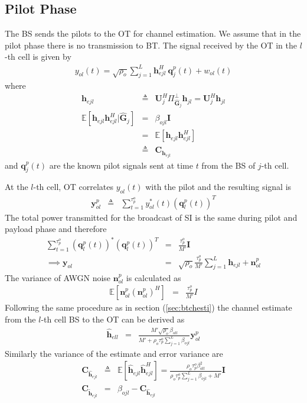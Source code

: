\documentclass[10pt, a4paper, twoside,fleqn]{article}
\begin{document}
\subsection{Pilot Phase}
	The BS sends the pilots to the OT for channel estimation. We assume that in the pilot phase there is no transmission to BT.
The signal received by the OT in the $l$-th cell is given by
\begin{eqnarray}
	y_{ol}(t)=\sqrt{\rho_o} \sum_{j=1}^{L} \pmb{h}^H_{ejl} \ \pmb{q}^p_{j}(t) + w_{ol}(t) 
\end{eqnarray}
where
\begin{eqnarray}
	\pmb{h}_{ejl} &\triangleq& \pmb{U}_j^H\Pi^{\perp}_{{\hat{\pmb{G}}_j}}\pmb{h}_{jl} = \pmb{U}_j^H\pmb{h}_{jl} \\
    \mathbb{E}[\pmb{h}_{ejl}\pmb{h}^H_{ejl}|\pmb{\hat G}_j] &=& \beta_{ojl}\pmb{I} \nonumber \\
			                     &=& \mathbb{E}[\pmb{h}_{ejl}\pmb{h}^H_{ejl}] \nonumber \\
                                           &\triangleq& \pmb{C}_{\pmb{h}_{ejl}} \nonumber
\end{eqnarray}
and $\pmb{q}_j^p(t)$ are the known pilot signals sent at time $t$ from the BS of $j$-th cell.

At the $l$-th cell, OT correlates $y_{ol}(t)$ with the pilot and the resulting signal is
\begin{eqnarray}
	\pmb{y}_{ol}^{p} &\triangleq& \sum_{t=1}^{\tau_p^o} y_{ol}^*(t)(\pmb{q}^{p}_{l}(t))^T \nonumber
\end{eqnarray}
The total power transmitted for the broadcast of SI is the same during pilot and payload phase and therefore
\begin{eqnarray}
    \sum\limits_{t=1}^{\tau_p^o}(\pmb{q}^p_{l}(t))^*(\pmb{q}^p_{l}(t))^T&=&\frac{\tau_p^o}{M'}\pmb{I} \\
\implies \pmb{y}_{ol} &=& \sqrt{\rho_o}\frac{\tau_p^o}{M'}\sum_{j=1}^{L}\pmb{h}_{ejl}+\pmb{n}^p_{ol}
\end{eqnarray}
The variance of AWGN noise $\pmb{n}_{ol}^p$ is calculated as
\begin{eqnarray}
	\mathbb{E}[\pmb{n}^p_{ol}(\pmb{n}^p_{ol})^H] &=& \frac{\tau_p^o}{M'}I \nonumber
\end{eqnarray}
Following the same procedure as in section (\ref{sec:btchesti}) the channel estimate from the $l$-th cell BS to the OT can be derived as 
\begin{eqnarray}\label{eqn:otchesti}
	\pmb{\hat h}_{ell} &=& \frac{M'\sqrt{\rho_o}\beta_{oll}}{M'+\rho_o\tau_p^o\sum\limits_{j=1}^{L}\beta_{ojl}}\pmb{y}^p_{ol}
\end{eqnarray}
Similarly the variance of the estimate and error variance are
\begin{eqnarray}
	\pmb{C}_{\pmb{\hat h}_{ejl}} &\triangleq& \mathbb{E}[\pmb{\hat h}_{ejl}\pmb{\hat h}^H_{ejl}] = \frac{\rho_o\tau_p^o\beta^2_{oll}}{\rho_o\tau_p^o\sum\limits_{j=1}^{L}\beta_{ojl}+M'}\pmb{I} \\
	\pmb{C}_{\pmb{\widetilde{h}}_{ejl}} &=& \beta_{ojl} - 	\pmb{C}_{\pmb{\hat h}_{ejl}}
\end{eqnarray}
\end{document}
